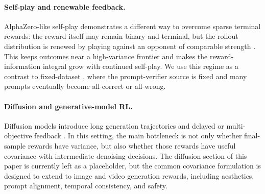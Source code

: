 \paragraph{Self-play and renewable feedback.}
AlphaZero-like self-play demonstrates a different way to overcome sparse terminal rewards: the reward itself may remain binary and terminal, but the rollout distribution is renewed by playing against an opponent of comparable strength \cite{silver2017mastering}. This keeps outcomes near a high-variance frontier and makes the reward-information integral grow with continued self-play. We use this regime as a contrast to fixed-dataset \llm{} \rlvr{}, where the prompt-verifier source is fixed and many prompts eventually become all-correct or all-wrong.

\paragraph{Diffusion and generative-model RL.}
Diffusion models introduce long generation trajectories and delayed or multi-objective feedback \cite{ho2020denoising}. In this setting, the main bottleneck is not only whether final-sample rewards have variance, but also whether those rewards have useful covariance with intermediate denoising decisions. The diffusion section of this paper is currently left as a placeholder, but the common covariance formulation is designed to extend to image and video generation rewards, including aesthetics, prompt alignment, temporal consistency, and safety.
